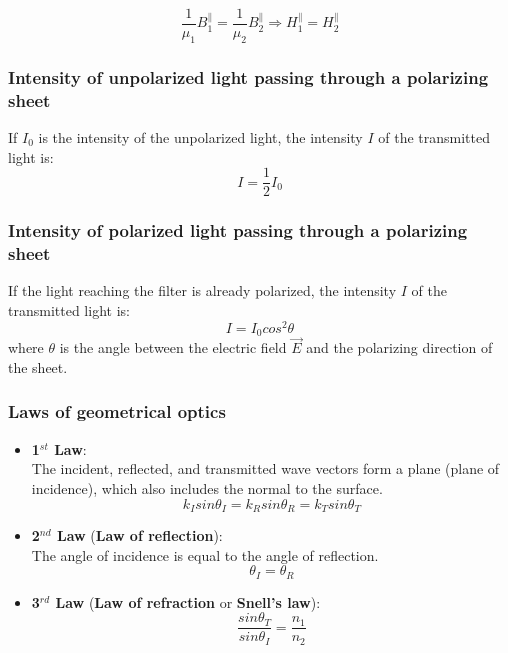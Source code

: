 \documentclass[english,11pt]{article}
\begin{document}
\begin{equation*}
    \frac{1}{\mu_1} B_1^{\parallel} = \frac{1}{\mu_2} B_2^{\parallel} \Rightarrow
    H_1^{\parallel} = H_2^{\parallel}
\end{equation*}


\subsubsection*{\bf Intensity of unpolarized light passing through a polarizing sheet}
If $I_0$ is the intensity of the unpolarized light,
the intensity $I$ of the transmitted light is:
\begin{equation*}
  I = \frac{1}{2}I_0
\end{equation*}


\subsubsection*{\bf Intensity of polarized light passing through a polarizing sheet}
If the light reaching the filter is already polarized,
the intensity $I$ of the transmitted light is:
\begin{equation*}
  I = I_0 cos^2\theta
\end{equation*}
where $\theta$ is the angle between the electric field $\vec{E}$
and the polarizing direction of the sheet.

\subsubsection*{\bf Laws of geometrical optics}
\begin{itemize}
  \item {\bf 1$^{st}$ Law}:\\
     The incident, reflected, and transmitted wave vectors form a plane (plane of incidence),
     which also includes the normal to the surface.
     \begin{equation*}
          k_I sin\theta_I = k_R sin\theta_R = k_T sin\theta_T
      \end{equation*}
  \item {\bf 2$^{nd}$ Law} ({\bf Law of reflection}):\\
     The angle of incidence is equal to the angle of reflection.
     \begin{equation*}
          \theta_I = \theta_R
      \end{equation*}
  \item {\bf 3$^{rd}$ Law} ({\bf Law of refraction} or {\bf Snell's law}):\\
     \begin{equation*}
          \frac{sin\theta_T}{sin\theta_I} = \frac{n_1}{n_2}
      \end{equation*}
\end{itemize}
\end{document}
